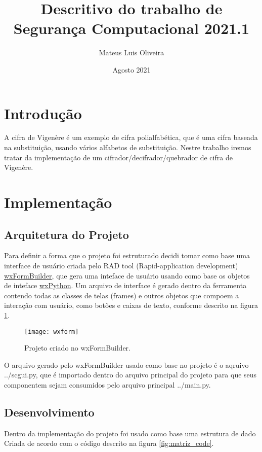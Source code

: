 \documentclass{article}
\title{Descritivo do trabalho de Segurança Computacional 2021.1}
\author{Mateus Luis Oliveira}
\date{Agosto 2021}
\begin{document}
\maketitle

\section{Introdução}
A cifra de Vigenère é um exemplo de cifra polialfabética, que é uma cifra baseada 
na substituição, usando vários alfabetos de substituição. Nestre trabalho iremos tratar da implementação de um cifrador/decifrador/quebrador 
de cifra de Vigenère.



\section{Implementação}

\subsection{Arquitetura do Projeto}
Para definir a forma que o projeto foi estruturado decidi tomar como base uma interface de usuário criada pelo RAD tool (Rapid-application development) 
\href{https://github.com/wxFormBuilder/wxFormBuilder}{wxFormBuilder}, que gera uma inteface de usuário usando como base os objetos de inteface
\href{https://www.wxpython.org/}{wxPython}. Um arquivo de interface é gerado dentro da ferramenta contendo todas as classes de telas (frames) e 
outros objetos que compoem a interação com usuário, como botões e caixas de texto, conforme descrito na figura \ref{fig:wxform}.

\begin{figure}[h]
  \texttt{[image: wxform]}
  \centering
  \caption{Projeto criado no wxFormBuilder.}
  \label{fig:wxform}
\end{figure}
O arquivo gerado pelo wxFormBuilder usado como base no projeto é o aqruivo ../scgui.py, que é importado dentro do arquivo principal do projeto
para que seus componentem sejam consumidos pelo arquivo principal ../main.py.

\subsection{Desenvolvimento}


Dentro da implementação do projeto foi usado como base uma estrutura de dado
Criada de acordo com o código descrito na figura \ref{fig:matriz_code}.
\end{document}
